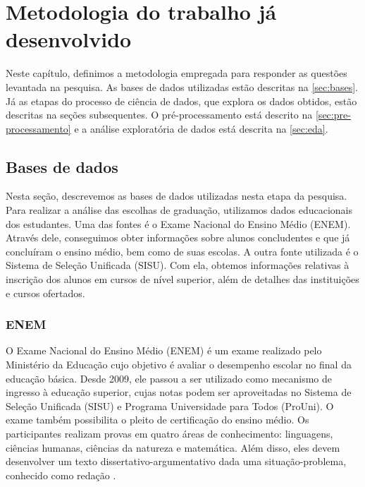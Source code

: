 
\chapter{Metodologia do trabalho já desenvolvido}
\label{chap:metodologia}

Neste capítulo, definimos a metodologia empregada para responder as questões levantada na pesquisa. As bases de dados utilizadas estão descritas na \autoref{sec:bases}. Já as etapas do processo de ciência de dados, que explora os dados obtidos, estão descritas na seções subsequentes. O pré-processamento está descrito na \autoref{sec:pre-processamento} e a análise exploratória de dados está descrita na \autoref{sec:eda}.

\section{Bases de dados}
\label{sec:bases}
Nesta seção, descrevemos as bases de dados utilizadas nesta etapa da pesquisa. Para realizar a análise das escolhas de graduação, utilizamos dados educacionais dos estudantes. Uma das fontes é o Exame Nacional do Ensino Médio (ENEM). Através dele, conseguimos obter informações sobre alunos concludentes e que já concluíram o ensino médio, bem como de suas escolas. A outra fonte utilizada é o Sistema de Seleção Unificada (SISU). Com ela, obtemos informações relativas à inscrição dos alunos em cursos de nível superior, além de detalhes das instituições e cursos ofertados.

\subsection{ENEM}
O Exame Nacional do Ensino Médio (ENEM) é um exame realizado pelo Ministério da Educação cujo objetivo é avaliar o desempenho escolar no final da educação básica. Desde 2009, ele passou a ser utilizado como mecanismo de ingresso à educação superior, cujas notas podem ser aproveitadas no Sistema de Seleção Unificada (SISU) e Programa Universidade para Todos (ProUni). O exame também possibilita o pleito de certificação do ensino médio. Os participantes realizam provas em quatro áreas de conhecimento: linguagens, ciências humanas, ciências da natureza e matemática. Além disso, eles devem desenvolver um texto dissertativo-argumentativo dada uma situação-problema, conhecido como redação \autocite{inep:1}.

